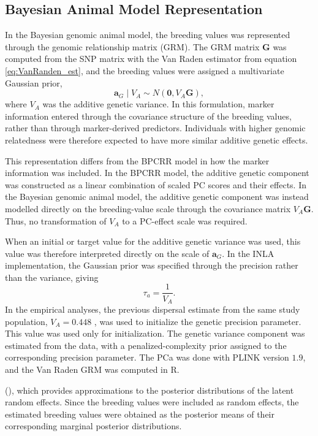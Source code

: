 \subsection{Bayesian Animal Model Representation}

In the Bayesian genomic animal model, the breeding values was represented through the genomic relationship matrix (GRM). 
The GRM matrix $\mathbf{G}$ was computed from the SNP matrix with the Van Raden estimator from equation \eqref{eq:VanRanden_est}, and the breeding values were assigned a multivariate Gaussian prior,
%
\begin{equation}
\mathbf{a}_G \mid V_A \sim N(\mathbf{0}, V_A \mathbf{G}) ,
\label{eq:grm_representation}
\end{equation}
%
where $V_A$ was the additive genetic variance. In this formulation, marker information entered through the covariance structure of the breeding values, rather than through marker-derived predictors. Individuals with higher genomic relatedness were therefore expected to have more similar additive genetic effects.

This representation differs from the BPCRR model in how the marker information was included. In the BPCRR model, the additive genetic component was constructed as a linear combination of scaled PC scores and their effects. In the Bayesian genomic animal model, the additive genetic component was instead modelled directly on the breeding-value scale through the covariance matrix $V_A\mathbf{G}$. Thus, no transformation of $V_A$ to a PC-effect scale was required.

When an initial or target value for the additive genetic variance was used, this value was therefore interpreted directly on the scale of $\mathbf{a}_G$. In the INLA implementation, the Gaussian prior was specified through the precision rather than the variance, giving
%
\[
\tau_a = \frac{1}{V_A}.
\]
In the empirical analyses, the previous dispersal estimate from the same study population, $V_A = 0.448$ \parencite{saatoglu_genetic_2024}, was used to initialize the genetic precision parameter. This value was used only for initialization. The genetic variance component was estimated from the data, with a penalized-complexity prior assigned to the corresponding precision parameter. The PCa was done with PLINK version $1.9$, and the Van Raden GRM was computed in R. 


(\cite{rue_approximate_2009, martino_integrated_2019}), which provides approximations to the posterior distributions of the latent random effects. Since the breeding values were included as random effects, the estimated breeding values were obtained as the posterior means of their corresponding marginal posterior distributions.

